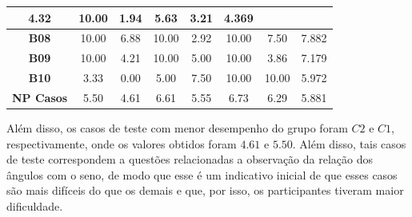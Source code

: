 \begin{table}[htbp]
\begin{tabular}{|c|ccccccc|}
		\multicolumn{1}{c|}{\cellcolor[HTML]{FFFFFF}4.32} &
		\multicolumn{1}{c|}{\cellcolor[HTML]{FFFFFF}10.00} &
		\multicolumn{1}{c|}{\cellcolor[HTML]{FFFFFF}1.94} &
		\multicolumn{1}{c|}{\cellcolor[HTML]{FFFFFF}5.63} &
		\multicolumn{1}{c|}{\cellcolor[HTML]{FFFFFF}3.21} &
		4.369 \\ \hline
		\rowcolor[HTML]{F2F2F2} 
		\textbf{B08} &
		\multicolumn{1}{c|}{\cellcolor[HTML]{F2F2F2}10.00} &
		\multicolumn{1}{c|}{\cellcolor[HTML]{F2F2F2}6.88} &
		\multicolumn{1}{c|}{\cellcolor[HTML]{F2F2F2}10.00} &
		\multicolumn{1}{c|}{\cellcolor[HTML]{F2F2F2}2.92} &
		\multicolumn{1}{c|}{\cellcolor[HTML]{F2F2F2}10.00} &
		\multicolumn{1}{c|}{\cellcolor[HTML]{F2F2F2}7.50} &
		7.882 \\ \hline
		\textbf{B09} &
		\multicolumn{1}{c|}{\cellcolor[HTML]{FFFFFF}10.00} &
		\multicolumn{1}{c|}{\cellcolor[HTML]{FFFFFF}4.21} &
		\multicolumn{1}{c|}{\cellcolor[HTML]{FFFFFF}10.00} &
		\multicolumn{1}{c|}{\cellcolor[HTML]{FFFFFF}5.00} &
		\multicolumn{1}{c|}{\cellcolor[HTML]{FFFFFF}10.00} &
		\multicolumn{1}{c|}{\cellcolor[HTML]{FFFFFF}3.86} &
		7.179 \\ \hline
		\rowcolor[HTML]{F2F2F2} 
		\textbf{B10} &
		\multicolumn{1}{c|}{\cellcolor[HTML]{F2F2F2}3.33} &
		\multicolumn{1}{c|}{\cellcolor[HTML]{F2F2F2}0.00} &
		\multicolumn{1}{c|}{\cellcolor[HTML]{F2F2F2}5.00} &
		\multicolumn{1}{c|}{\cellcolor[HTML]{F2F2F2}7.50} &
		\multicolumn{1}{c|}{\cellcolor[HTML]{F2F2F2}10.00} &
		\multicolumn{1}{c|}{\cellcolor[HTML]{F2F2F2}10.00} &
		5.972 \\ \hline
		\rowcolor[HTML]{D0CECE} 
		\textbf{NP Casos} &
		\multicolumn{1}{c|}{\cellcolor[HTML]{D0CECE}5.50} &
		\multicolumn{1}{c|}{\cellcolor[HTML]{D0CECE}4.61} &
		\multicolumn{1}{c|}{\cellcolor[HTML]{D0CECE}6.61} &
		\multicolumn{1}{c|}{\cellcolor[HTML]{D0CECE}5.55} &
		\multicolumn{1}{c|}{\cellcolor[HTML]{D0CECE}6.73} &
		\multicolumn{1}{c|}{\cellcolor[HTML]{D0CECE}6.29} &
		5.881 \\ \hline
	\end{tabular}
	\label{tab:F3_A3_NP_ESTUDO}
\end{table}

Além disso, os casos de teste com menor desempenho do grupo foram $C2$ e $C1$, respectivamente, onde os valores obtidos foram $4.61$ e $5.50$. Além disso, tais casos de teste correspondem a questões relacionadas a observação da relação dos ângulos com o seno, de modo que esse é um indicativo inicial de que esses casos são mais difíceis do que os demais e que, por isso, os participantes tiveram maior dificuldade.

